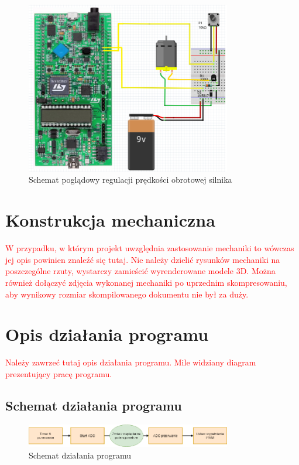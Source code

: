 \documentclass[10pt, a4paper]{article}
\begin{document}
\begin{figure}[H]
	\centering
	\includegraphics[width=0.8\textwidth]{figures/pwm.png}
	\caption{Schemat poglądowy regulacji prędkości obrotowej silnika}
	\label{fig:KonfiguracjaPWM}
\end{figure}

\section{Konstrukcja mechaniczna}
\textcolor{red}{W przypadku, w którym projekt uwzględnia zastosowanie 
	mechaniki to wówczas jej opis powinien znaleźć się tutaj.
	Nie należy dzielić rysunków mechaniki na poszczególne rzuty, 
	wystarczy zamieścić wyrenderowane modele 3D.
	Można również dołączyć zdjęcia wykonanej 
	mechaniki po uprzednim skompresowaniu, aby wynikowy rozmiar 
	skompilowanego dokumentu nie był za duży.}

\section{Opis działania programu}
\textcolor{red}{Należy zawrzeć tutaj opis działania programu.
	Mile widziany diagram prezentujący pracę programu.}

\subsection{Schemat działania programu}
	\begin{figure}[H]
		\centering
		\includegraphics[width=0.8\textwidth]{figures/diagramPWM.png}
		\caption{Schemat działania programu}
		\label{fig:diagramPWM}
	\end{figure}
\end{document}
